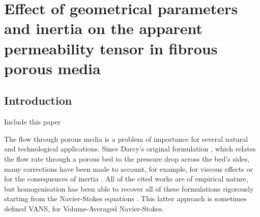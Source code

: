\chapter{Effect of geometrical parameters and inertia on the apparent permeability tensor in fibrous porous media}
\label{ch:4}



\section{Introduction}

Include this paper \citet{penha2011computing}

The flow through porous media is a problem of importance for several natural and technological applications. Since Darcy's original
formulation \cite{darcy}, which relates the flow rate through a porous bed to the pressure drop across the bed's sides, many
corrections have been made to account, for example, for viscous effects \cite{brinkman} or for the consequences of inertia \cite{forchheimer}.  
All of the cited works are of empirical nature, but homogenisation has been able to recover all of these
formulations rigorously starting from the Navier-Stokes equations \cite{whitaker2013method}. This latter approach is sometimes defined 
VANS, for Volume-Averaged Navier-Stokes.

